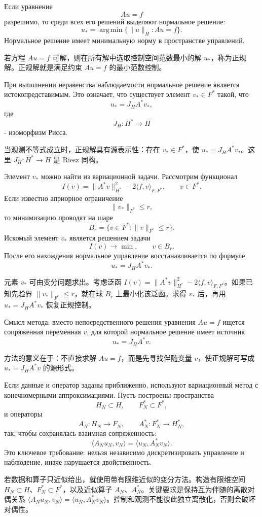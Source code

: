 \documentclass[12pt,a4paper]{article}
\newcommand{\zh}[1]{\par\noindent #1\par}
\begin{document}

Если уравнение
\[
 Au=f
\]
разрешимо, то среди всех его решений выделяют нормальное решение:
\[
 u_*=
 \operatorname*{arg\,min}\{\|u\|_H: Au=f\}.
\]
Нормальное решение имеет минимальную норму в пространстве управлений.
\zh{若方程 \(Au=f\) 可解，则在所有解中选取控制空间范数最小的解 \(u_*\)，称为正规解。正规解就是满足约束 \(Au=f\) 的最小范数控制。}

При выполнении неравенства наблюдаемости нормальное решение является истокопредставимым. Это означает, что существует элемент $v_*\in F^*$ такой, что
\[
 u_*=J_HA^*v_*,
\]
где
\[
 J_H:H^*\to H
\]
- изоморфизм Рисса.
\zh{当观测不等式成立时，正规解具有源表示性：存在 \(v_*\in F^*\)，使 \(u_*=J_HA^*v_*\)。这里 \(J_H:H^*\to H\) 是 Riesz 同构。}

Элемент $v_*$ можно найти из вариационной задачи. Рассмотрим функционал
\[
 I(v)=\|A^*v\|_{H^*}^2-2\langle f,v\rangle_{F,F^*},
 \qquad v\in F^*.
\]
Если известно априорное ограничение
\[
 \|v_*\|_{F^*}\le r,
\]
то минимизацию проводят на шаре
\[
 B_r=\{v\in F^*: \|v\|_{F^*}\le r\}.
\]
Искомый элемент $v_*$ является решением задачи
\[
 I(v)\to\min,\qquad v\in B_r.
\]
После его нахождения нормальное управление восстанавливается по формуле
\[
 u_*=J_HA^*v_*.
\]
\zh{元素 \(v_*\) 可由变分问题求出。考虑泛函 \(I(v)=\|A^*v\|_{H^*}^2-2\langle f,v\rangle_{F,F^*}\)。如果已知先验界 \(\|v_*\|_{F^*}\le r\)，就在球 \(B_r\) 上最小化该泛函。求得 \(v_*\) 后，再用 \(u_*=J_HA^*v_*\) 恢复正规控制。}

Смысл метода: вместо непосредственного решения уравнения $Au=f$ ищется сопряженная переменная $v$, для которой нормальное решение имеет источник
\[
 u_*=J_HA^*v.
\]
\zh{方法的意义在于：不直接求解 \(Au=f\)，而是先寻找伴随变量 \(v\)，使正规解可写成 \(u_*=J_HA^*v\) 的源形式。}


Если данные и оператор заданы приближенно, используют вариационный метод с конечномерными аппроксимациями. Пусть построены пространства
\[
 H_N\subset H,
 \qquad
 F_N^*\subset F^*,
\]
и операторы
\[
 A_N:H_N\to F_N,
 \qquad
 A_N^*:F_N^*\to H_N^*,
\]
так, чтобы сохранялась взаимная сопряженность:
\[
 \langle A_Nu_N,v_N\rangle=\langle u_N,A_N^*v_N\rangle.
\]
Это ключевое требование: нельзя независимо дискретизировать управление и наблюдение, иначе нарушается двойственность.
\zh{若数据和算子只近似给出，就使用带有限维近似的变分方法。构造有限维空间 \(H_N\subset H\)、\(F_N^*\subset F^*\)，以及近似算子 \(A_N\)、\(A_N^*\)。关键要求是保持互为伴随的离散对偶关系 \(\langle A_Nu_N,v_N\rangle=\langle u_N,A_N^*v_N\rangle\)。控制和观测不能彼此独立离散化，否则会破坏对偶性。}
\end{document}
